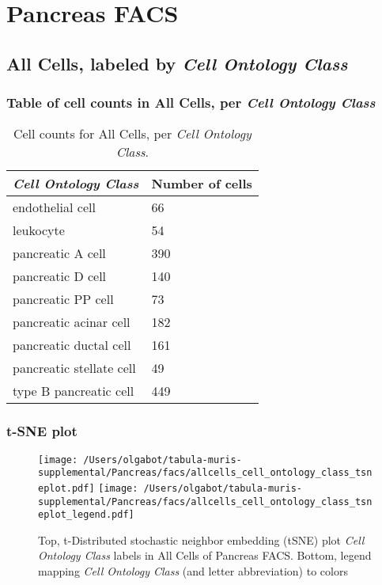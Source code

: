 \clearpage
\section{Pancreas FACS}

\subsection{All Cells, labeled by \emph{Cell Ontology Class}}
\subsubsection{Table of cell counts in All Cells, per \emph{Cell Ontology Class}}\begin{table}[h]
\centering
\label{my-label}
\begin{tabular}{@{}ll@{}}
\toprule

\emph{Cell Ontology Class}& Number of cells \\ \midrule
endothelial cell & 66 \\

leukocyte & 54 \\

pancreatic A cell & 390 \\

pancreatic D cell & 140 \\

pancreatic PP cell & 73 \\

pancreatic acinar cell & 182 \\

pancreatic ductal cell & 161 \\

pancreatic stellate cell & 49 \\

type B pancreatic cell & 449 \\
\bottomrule
\end{tabular}
\caption{Cell counts for All Cells, per \emph{Cell Ontology Class}.}
\end{table}

\clearpage
\subsubsection{t-SNE plot}
\begin{figure}[h]
\centering
\texttt{[image: /Users/olgabot/tabula-muris-supplemental/Pancreas/facs/allcells\_cell\_ontology\_class\_tsneplot.pdf]}
\texttt{[image: /Users/olgabot/tabula-muris-supplemental/Pancreas/facs/allcells\_cell\_ontology\_class\_tsneplot\_legend.pdf]}
\caption{Top, t-Distributed stochastic neighbor embedding (tSNE) plot  \emph{Cell Ontology Class} labels in All Cells of Pancreas FACS. Bottom, legend mapping \emph{Cell Ontology Class} (and letter abbreviation) to colors}
\end{figure}



